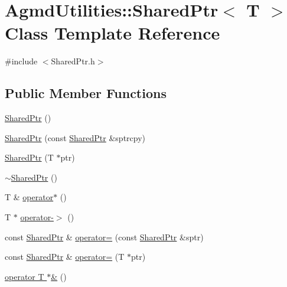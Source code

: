 \hypertarget{class_agmd_utilities_1_1_shared_ptr}{\section{Agmd\+Utilities\+:\+:Shared\+Ptr$<$ T $>$ Class Template Reference}
\label{class_agmd_utilities_1_1_shared_ptr}
}


{\ttfamily \#include $<$Shared\+Ptr.\+h$>$}

\subsection*{Public Member Functions}
\begin{DoxyCompactItemize}
\item 
\hyperlink{class_agmd_utilities_1_1_shared_ptr_a98d1cd0ab5f10cea89e92df6c2532fe9}{Shared\+Ptr} ()
\item 
\hyperlink{class_agmd_utilities_1_1_shared_ptr_aacd9e3e1c4b694f12ff3cbccf36e8703}{Shared\+Ptr} (const \hyperlink{class_agmd_utilities_1_1_shared_ptr}{Shared\+Ptr} \&sptrcpy)
\item 
\hyperlink{class_agmd_utilities_1_1_shared_ptr_a2362bfcb783caf4d536004c67088ad2c}{Shared\+Ptr} (T $\ast$ptr)
\item 
\hyperlink{class_agmd_utilities_1_1_shared_ptr_a9a40addd7829baeda98cf714d968414d}{$\sim$\+Shared\+Ptr} ()
\item 
T \& \hyperlink{class_agmd_utilities_1_1_shared_ptr_a97accc168d99098b097af7336ed5ba9d}{operator$\ast$} ()
\item 
T $\ast$ \hyperlink{class_agmd_utilities_1_1_shared_ptr_a9de5eea98fe12d2521d637b50eb6d941}{operator-\/$>$} ()
\item 
const \hyperlink{class_agmd_utilities_1_1_shared_ptr}{Shared\+Ptr} \& \hyperlink{class_agmd_utilities_1_1_shared_ptr_a4afce9f7839b8f73d8a1b7e629f2b473}{operator=} (const \hyperlink{class_agmd_utilities_1_1_shared_ptr}{Shared\+Ptr} \&sptr)
\item 
const \hyperlink{class_agmd_utilities_1_1_shared_ptr}{Shared\+Ptr} \& \hyperlink{class_agmd_utilities_1_1_shared_ptr_ab0a1514067bdbd525747c1934e252233}{operator=} (T $\ast$ptr)
\item 
\hyperlink{class_agmd_utilities_1_1_shared_ptr_ab477aaa7288996e0b8ce7db1ea078ac5}{operator T $\ast$\&} ()
\end{DoxyCompactItemize}


